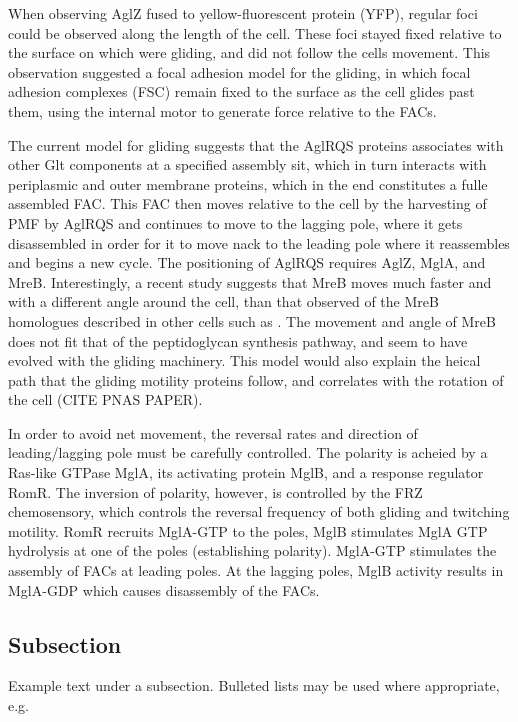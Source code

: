 \documentclass[fleqn,10pt]{wlscirep}
\begin{document}
When observing AglZ fused to yellow-fluorescent protein (YFP), regular foci could be observed along the length of the cell. These foci stayed fixed relative to the surface on which  were gliding, and did not follow the cells movement. This observation suggested a focal adhesion model for the gliding, in which focal adhesion complexes (FSC) remain fixed to the surface as the cell glides past them, using the internal motor to generate force relative to the FACs.

The current model for gliding suggests that the AglRQS proteins associates with other Glt components at a specified assembly sit, which in turn interacts with periplasmic and outer membrane proteins, which in the end constitutes a fulle assembled FAC. This FAC then moves relative to the cell by the harvesting of PMF by AglRQS and continues to move to the lagging pole, where it gets disassembled in order for it to move nack to the leading pole where it reassembles and begins a new cycle.
The positioning of AglRQS requires AglZ, MglA, and MreB. Interestingly, a recent study suggests that MreB moves much faster and with a different angle around the cell, than that observed of the MreB homologues described in other cells such as \italicp[E. coli]. The movement and angle of MreB does not fit that of the peptidoglycan synthesis pathway, and seem to have evolved with the gliding machinery. This model would also explain the heical path that the gliding motility proteins follow, and correlates with the rotation of the cell (CITE PNAS PAPER).

In order to avoid net movement, the reversal rates and direction of leading/lagging pole must be carefully controlled. The polarity is acheied by a Ras-like GTPase MglA, its activating protein MglB, and a response regulator RomR. The inversion of polarity, however, is controlled by the FRZ chemosensory, which controls the reversal frequency of both gliding and twitching motility. RomR recruits MglA-GTP to the poles, MglB stimulates MglA GTP hydrolysis at one of the poles (establishing polarity). MglA-GTP stimulates the assembly of FACs at leading poles. At the lagging poles, MglB activity results in MglA-GDP which causes disassembly of the FACs.



\subsection*{Subsection}

Example text under a subsection. Bulleted lists may be used where appropriate, e.g.
\end{document}
